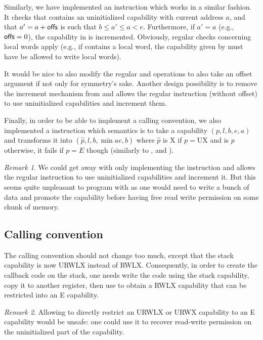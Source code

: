 \documentclass[a4paper, 10pt]{article}
\theoremstyle{remark}
\newtheorem*{remark}{Remark}
\begin{document}
Similarly, we have implemented an instruction {\color{blue}} which works in a similar fashion. It checks that  contains an uninitialized capability with current address $a$, and that $a' = a + \textsf{offs}$ is such that $b \leq a' \leq a < e$. Furthermore, if $a' = a$ (e.g., $\textsf{offs} = 0$), the capability in  is incremented. Obviously, regular checks concerning local words apply (e.g., if  contains a local word, the capability given by  must have be allowed to write local words).

It would be nice to also modify the regular  and  operations to also take an offset argument if not only for symmetry's sake. Another design possibility is to remove the increment mechanism from  and allows the regular  instruction (without offset) to use uninitialized capabilities and increment them.

Finally, in order to be able to implement a calling convention, we also implemented a {\color{blue}} instruction which semantics is to take a capability $(p, l, b, e, a)$ and transforms it into $(\hat{p}, l, b, \min{a}{e}, b)$ where $\hat{p}$ is X if $p = \text{UX}$ and is $p$ otherwise, it fails if $p = E$ though (similarly to ,  and ).

\begin{remark}
  We could get away with only implementing the  instruction and allows the regular  instruction to use uninitialized capabilities and increment it. But this seems quite unpleasant to program with as one would need to write a bunch of data and promote the capability before having free read write permission on some chunk of memory.
\end{remark}

\subsection{Calling convention}

The calling convention should not change too much, except that the stack capability is now URWLX instead of RWLX. Consequently, in order to create the callback code on the stack, one needs write the code using the stack capability, copy it to another register, then use  to obtain a RWLX capability that can be restricted into an E capability.

\begin{remark}
  Allowing to directly restrict an URWLX or URWX capability to an E capability would be unsafe: one could use it to recover read-write permission on the uninitialized part of the capability.
\end{remark}


\end{document}
